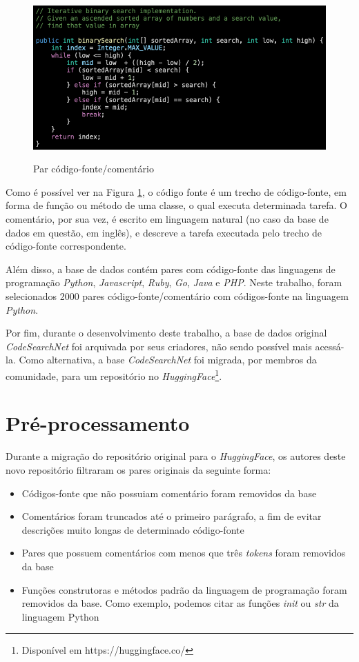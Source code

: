 \begin{figure}[H]
    \centering
        \caption{Par código-fonte/comentário}
        \includegraphics[scale=0.5]{code-comment-pair.png}
        \label{fig:metodology-code-comment-pair}
\end{figure}

Como é possível ver na Figura \ref{fig:metodology-code-comment-pair}, o código fonte é um trecho de código-fonte, em forma de função ou método de uma classe, o qual executa determinada tarefa. O comentário, por sua vez, é escrito em linguagem natural (no caso da base de dados em questão, em inglês), e descreve a tarefa executada pelo trecho de código-fonte correspondente.

Além disso, a base de dados contém pares com código-fonte das linguagens de programação \textit{Python}, \textit{Javascript}, \textit{Ruby}, \textit{Go}, \textit{Java} e \textit{PHP}. Neste trabalho, foram selecionados 2000 pares código-fonte/comentário com códigos-fonte na linguagem \textit{Python}.

Por fim, durante o desenvolvimento deste trabalho, a base de dados original \textit{CodeSearchNet} foi arquivada por seus criadores, não sendo possível mais acessá-la. Como alternativa, a base \textit{CodeSearchNet} foi migrada, por membros da comunidade, para um repositório no \textit{HuggingFace}\footnote{Disponível em https://huggingface.co/}.


\section{Pré-processamento}
\label{sec:methodology:pre-processing}

Durante a migração do repositório original para o \textit{HuggingFace}, os autores deste novo repositório filtraram os pares originais da seguinte forma:
\begin{itemize}
    \item Códigos-fonte que não possuiam comentário foram removidos da base
    \item Comentários foram truncados até o primeiro parágrafo, a fim de evitar descrições muito longas de determinado código-fonte
    \item Pares que possuem comentários com menos que três \textit{tokens} foram removidos da base
    \item Funções construtoras e métodos padrão da linguagem de programação foram removidos da base. Como exemplo, podemos citar as funções \textit{init} ou \textit{str} da linguagem Python
\end{itemize}


